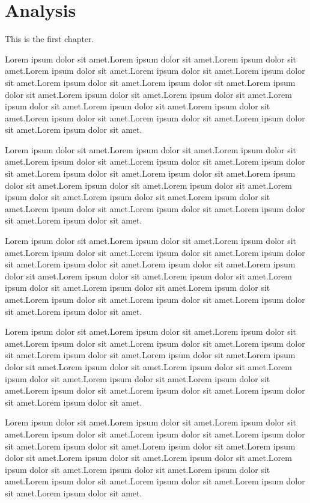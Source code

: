 \documentclass[main.tex]{subfiles}
\begin{document}
\chapter{Analysis}
This is the first chapter.

Lorem ipsum dolor sit amet.Lorem ipsum dolor sit amet.Lorem ipsum dolor sit amet.Lorem ipsum dolor sit amet.Lorem ipsum dolor sit amet.Lorem ipsum dolor sit amet.Lorem ipsum dolor sit amet.Lorem ipsum dolor sit amet.Lorem ipsum dolor sit amet.Lorem ipsum dolor sit amet.Lorem ipsum dolor sit amet.Lorem ipsum dolor sit amet.Lorem ipsum dolor sit amet.Lorem ipsum dolor sit amet.Lorem ipsum dolor sit amet.Lorem ipsum dolor sit amet.Lorem ipsum dolor sit amet.Lorem ipsum dolor sit amet.

Lorem ipsum dolor sit amet.Lorem ipsum dolor sit amet.Lorem ipsum dolor sit amet.Lorem ipsum dolor sit amet.Lorem ipsum dolor sit amet.Lorem ipsum dolor sit amet.Lorem ipsum dolor sit amet.Lorem ipsum dolor sit amet.Lorem ipsum dolor sit amet.Lorem ipsum dolor sit amet.Lorem ipsum dolor sit amet.Lorem ipsum dolor sit amet.Lorem ipsum dolor sit amet.Lorem ipsum dolor sit amet.Lorem ipsum dolor sit amet.Lorem ipsum dolor sit amet.Lorem ipsum dolor sit amet.Lorem ipsum dolor sit amet.

Lorem ipsum dolor sit amet.Lorem ipsum dolor sit amet.Lorem ipsum dolor sit amet.Lorem ipsum dolor sit amet.Lorem ipsum dolor sit amet.Lorem ipsum dolor sit amet.Lorem ipsum dolor sit amet.Lorem ipsum dolor sit amet.Lorem ipsum dolor sit amet.Lorem ipsum dolor sit amet.Lorem ipsum dolor sit amet.Lorem ipsum dolor sit amet.Lorem ipsum dolor sit amet.Lorem ipsum dolor sit amet.Lorem ipsum dolor sit amet.Lorem ipsum dolor sit amet.Lorem ipsum dolor sit amet.Lorem ipsum dolor sit amet.

Lorem ipsum dolor sit amet.Lorem ipsum dolor sit amet.Lorem ipsum dolor sit amet.Lorem ipsum dolor sit amet.Lorem ipsum dolor sit amet.Lorem ipsum dolor sit amet.Lorem ipsum dolor sit amet.Lorem ipsum dolor sit amet.Lorem ipsum dolor sit amet.Lorem ipsum dolor sit amet.Lorem ipsum dolor sit amet.Lorem ipsum dolor sit amet.Lorem ipsum dolor sit amet.Lorem ipsum dolor sit amet.Lorem ipsum dolor sit amet.Lorem ipsum dolor sit amet.Lorem ipsum dolor sit amet.Lorem ipsum dolor sit amet.

Lorem ipsum dolor sit amet.Lorem ipsum dolor sit amet.Lorem ipsum dolor sit amet.Lorem ipsum dolor sit amet.Lorem ipsum dolor sit amet.Lorem ipsum dolor sit amet.Lorem ipsum dolor sit amet.Lorem ipsum dolor sit amet.Lorem ipsum dolor sit amet.Lorem ipsum dolor sit amet.Lorem ipsum dolor sit amet.Lorem ipsum dolor sit amet.Lorem ipsum dolor sit amet.Lorem ipsum dolor sit amet.Lorem ipsum dolor sit amet.Lorem ipsum dolor sit amet.Lorem ipsum dolor sit amet.Lorem ipsum dolor sit amet.
\end{document}
